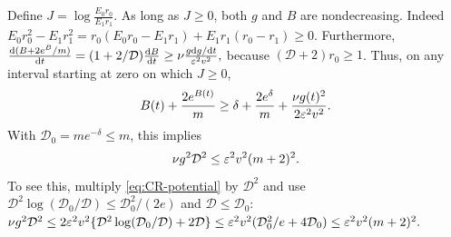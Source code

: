 Define
 $J=\log\frac{E_0r_0}{E_1r_1}.$ 
As long as $J\ge0$, both $g$ and $B$ are nondecreasing. Indeed
 $E_0r_0^2-E_1r_1^2 =r_0(E_0r_0-E_1r_1)+E_1r_1(r_0-r_1)\ge0.$ 
Furthermore,
 $\ddt{(B+2e^B/m)}=(1+2/\mathcal D)\ddt{B}\ge\nu\frac{g\ddt{g}}{\initscale^2v^2},$ 
because $(\mathcal D+2)r_0\ge1$. Thus, on any interval starting at zero on which $J\ge0$,
\begin{equation}
 B(t)+\frac{2e^{B(t)}}m\ge\delta+\frac{2e^\delta}m+\frac{\nu g(t)^2}{2\varepsilon^2v^2}.
 \label{eq:CR-potential}
\end{equation}
With $\mathcal D_0=me^{-\delta}\le m$, this implies
\begin{equation}
 \nu g^2\mathcal D^2\le\varepsilon^2v^2(m+2)^2.
 \label{eq:CR-budget}
\end{equation}
To see this, multiply \eqref{eq:CR-potential} by $\mathcal D^2$ and use
$\mathcal D^2\log(\mathcal D_0/\mathcal D)\le \mathcal D_0^2/(2e)$ and $\mathcal D\le \mathcal D_0$:
 $\nu g^2\mathcal D^2\le2\varepsilon^2v^2\{\mathcal D^2\log(\mathcal D_0/\mathcal D)+2\mathcal D\} \le\varepsilon^2v^2(\mathcal D_0^2/e+4\mathcal D_0)\le\varepsilon^2v^2(m+2)^2.$ 

